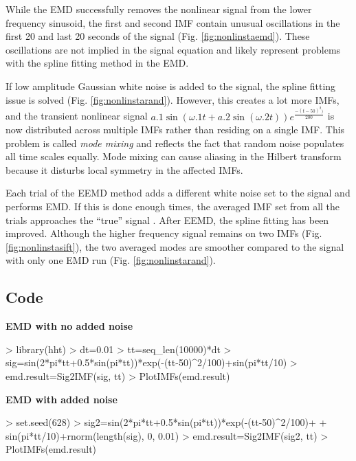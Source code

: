 \documentclass[12pt]{article}
\begin{document}
While the EMD successfully removes the nonlinear signal from the lower frequency sinusoid, the first and second IMF contain unusual oscillations in the first 20 and last 20 seconds of the signal (Fig. \ref{fig:nonlinstaemd}).
These oscillations are not implied in the signal equation and likely represent problems with the spline fitting method in the EMD.

If low amplitude Gaussian white noise is added to the signal, the spline fitting issue is solved (Fig. \ref{fig:nonlinstarand}).
However, this creates a lot more IMFs, and the transient nonlinear signal $a.{1}\sin(\omega.{1}t+a.2\sin(\omega.{2} t))e^{\frac{-(t-50)^{2})}{200}}$ is now distributed across multiple IMFs rather than residing on a single IMF.
This problem is called \emph{mode mixing} and reflects the fact that random noise populates all time scales equally.
Mode mixing can cause aliasing in the Hilbert transform because it disturbs local symmetry in the affected IMFs.

Each trial of the EEMD method adds a different white noise set to the signal and performs EMD. 
If this is done enough times, the averaged IMF set from all the trials approaches the ``true'' signal .
After EEMD, the spline fitting has been improved.
Although the higher frequency signal remains on two IMFs (Fig. \ref{fig:nonlinstasift}), the two averaged modes are smoother compared to the signal with only one EMD run (Fig. \ref{fig:nonlinstarand}).

\subsection{Code}

\textbf{EMD with no added noise}
\begin{Schunk}
\begin{Sinput}
> library(hht)
> dt=0.01
> tt=seq_len(10000)*dt
> sig=sin(2*pi*tt+0.5*sin(pi*tt))*exp(-(tt-50)^2/100)+sin(pi*tt/10)
> emd.result=Sig2IMF(sig, tt)
> PlotIMFs(emd.result)
\end{Sinput}
\end{Schunk}

\textbf{EMD with added noise}
\begin{Schunk}
\begin{Sinput}
> set.seed(628)
> sig2=sin(2*pi*tt+0.5*sin(pi*tt))*exp(-(tt-50)^2/100)+
+     sin(pi*tt/10)+rnorm(length(sig), 0, 0.01)
> emd.result=Sig2IMF(sig2, tt)
> PlotIMFs(emd.result)
\end{Sinput}
\end{Schunk}
\end{document}
